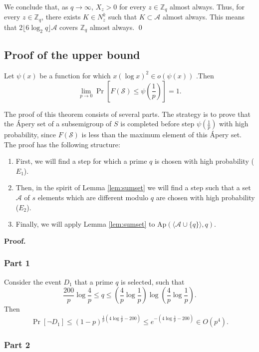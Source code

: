 We conclude that, as $q \to \infty$, $X_z > 0$ for every $z \in \mathbb{Z}_q$ almost always. Thus, for every $z \in \mathbb{Z}_q$, there exists $K \in N_z^k$ such that $K \subset \mathcal{A}$ almost always. This means that $2\lfloor 6 \log_2 q \rfloor \mathcal{A}$ covers $\mathbb{Z}_q$ almost always. \qed

\subsection{Proof of the upper bound} 
\begin{lemma}\label{lem:upperbound}
    Let $\psi(x)$ be a function for which $x(\log x)^2 \in o(\psi(x))$ .Then
    \[\lim_{p \to 0}\Pr\left[F(\mathcal{S}) \leq \psi\left(\frac{1}{p}\right)\right] = 1.\] 
\end{lemma}

\par The proof of this theorem consists of several parts. The strategy is to prove that the Ápery set of a subsemigroup of $S$ is completed before step $\psi\left(\frac{1}{p}\right)$ with high probability, since $F(\mathcal{S})$ is less than the maximum element of this Ápery set. The proof has the following structure: 
\begin{enumerate}
\item First, we will find a step for which a prime $q$ is chosen with high probability ($E_1$). 
\item Then, in the spirit of Lemma \ref{lem:sumset} we will find a step such that a set $\mathcal{A}$ of $s$ elements which are different modulo $q$ are chosen with high probability ($E_2$). 
\item Finally, we will apply Lemma \ref{lem:sumset} to $\mathrm{Ap}(\langle \mathcal{A} \cup \{q\}\rangle, q)$.
\end{enumerate}
\textbf{Proof. }
\subsubsection*{Part 1} 
Consider the event $D_1$ that a prime $q$ is selected, such that
\[\frac{200}{p}\log \frac{4}{p} \leq q \leq \left(\frac{4}{p}\log \frac{1}{p}\right)\log\left(\frac{4}{p}\log \frac{1}{p}\right).\]
Then
\[\Pr[\lnot D_1] \leq (1 - p)^{\frac{1}{p}\left(4\log\frac{1}{p} - 200\right)} \leq e^{-\left(4\log\frac{1}{p} - 200\right)} \in  O(p^4).\]
\subsubsection*{Part 2}

